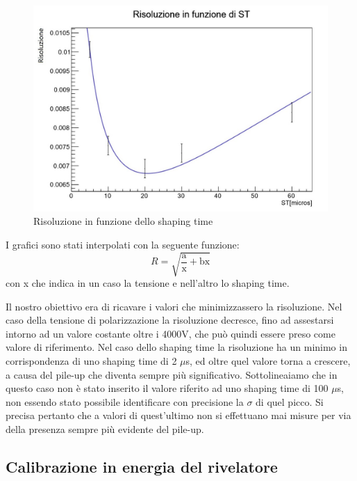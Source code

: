 \documentclass[a4paper,10pt]{article}
\begin{document}
\begin{figure}[!ht]
    \centering
    \includegraphics[scale=0.5]{grafici/risoluzionest}
    \caption{Risoluzione in funzione dello shaping time}
\end{figure}

\noindent I grafici sono stati interpolati con la seguente funzione: 
\begin{equation}
	R=\sqrt{\frac{\textrm{a}}{\textrm{x}}+\textrm{bx}}
\end{equation}
con x che indica in un caso la tensione e nell'altro lo shaping time.

\noindent Il nostro obiettivo era di ricavare i valori che minimizzassero la risoluzione. Nel caso della tensione di polarizzazione la risoluzione decresce, fino ad assestarsi intorno ad un valore costante oltre i 4000V, che pu\`o quindi essere preso come valore di riferimento. Nel caso dello shaping time la risoluzione ha un minimo in corrispondenza di uno shaping time di 2 $\mu$s, ed oltre quel valore torna a crescere, a causa del pile-up che diventa sempre pi\`u significativo. Sottolineaiamo che in questo caso non \`e stato inserito il valore riferito ad uno shaping time di 100 $\mu$s, non essendo stato possibile identificare con precisione la $\sigma$ di quel picco. Si precisa pertanto che a valori di quest'ultimo non si effettuano mai misure per via della presenza sempre pi\`u evidente del pile-up.
\subsection{Calibrazione in energia del rivelatore}

\end{document}
